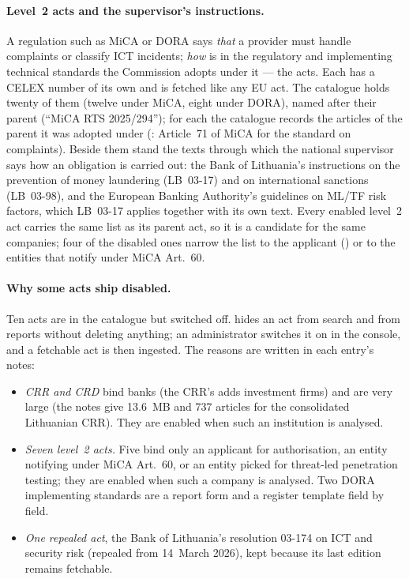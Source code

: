 \paragraph{Level~2 acts and the supervisor's instructions.} A regulation such as MiCA or DORA
says \emph{that} a provider must handle complaints or classify ICT incidents; \emph{how} is in
the regulatory and implementing technical standards the Commission adopts under it --- the
 acts. Each has a CELEX number of its own and is fetched like any EU act. The
catalogue holds twenty of them (twelve under MiCA, eight under DORA), named after their parent
(\enquote{MiCA RTS 2025/294}); for each the catalogue records the articles of the parent it was
adopted under (: Article~71 of MiCA for the standard on complaints).
Beside them stand the texts through which the national
supervisor says how an obligation is carried out: the Bank of Lithuania's instructions on the
prevention of money laundering (LB~03-17) and on international sanctions (LB~03-98), and the
European Banking Authority's guidelines on ML/TF risk factors, which LB~03-17 applies together
with its own text. Every enabled level~2 act carries the same  list as its
parent act, so it is a candidate for the same companies; four of the disabled ones narrow the
list to the applicant () or to the entities that notify under MiCA Art.~60.

\paragraph{Why some acts ship disabled.} Ten acts are in the catalogue but switched off.
 hides an act from search and from reports without deleting anything;
an administrator switches it on in the console, and a fetchable act is then ingested. The
reasons are written in each entry's notes:
\begin{itemize}
  \item \emph{CRR and CRD} bind banks (the CRR's  adds investment firms) and
    are very large (the notes give 13.6~MB and 737
    articles for the consolidated Lithuanian CRR). They are enabled when such an institution
    is analysed.
  \item \emph{Seven level~2 acts.} Five bind only an applicant for authorisation, an entity
    notifying under MiCA Art.~60, or an entity picked for threat-led penetration testing; they
    are enabled when such a company is analysed. Two DORA implementing standards are a report
    form and a register template field by field.
  \item \emph{One repealed act}, the Bank of Lithuania's resolution 03-174 on ICT and security
    risk (repealed from 14~March 2026), kept because its last edition remains fetchable.
\end{itemize}

